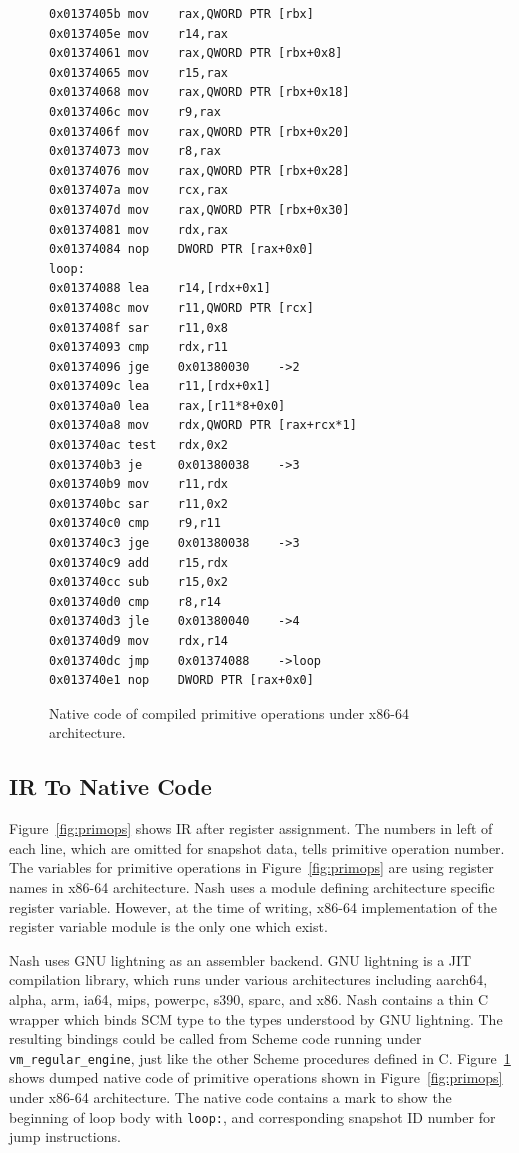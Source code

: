 \documentclass[preprint]{sigplanconf}
\begin{document}
\begin{figure}
  \centering
\begin{verbatim}
0x0137405b mov    rax,QWORD PTR [rbx]
0x0137405e mov    r14,rax
0x01374061 mov    rax,QWORD PTR [rbx+0x8]
0x01374065 mov    r15,rax
0x01374068 mov    rax,QWORD PTR [rbx+0x18]
0x0137406c mov    r9,rax
0x0137406f mov    rax,QWORD PTR [rbx+0x20]
0x01374073 mov    r8,rax
0x01374076 mov    rax,QWORD PTR [rbx+0x28]
0x0137407a mov    rcx,rax
0x0137407d mov    rax,QWORD PTR [rbx+0x30]
0x01374081 mov    rdx,rax
0x01374084 nop    DWORD PTR [rax+0x0]
loop:
0x01374088 lea    r14,[rdx+0x1]
0x0137408c mov    r11,QWORD PTR [rcx]
0x0137408f sar    r11,0x8
0x01374093 cmp    rdx,r11
0x01374096 jge    0x01380030    ->2
0x0137409c lea    r11,[rdx+0x1]
0x013740a0 lea    rax,[r11*8+0x0]
0x013740a8 mov    rdx,QWORD PTR [rax+rcx*1]
0x013740ac test   rdx,0x2
0x013740b3 je     0x01380038    ->3
0x013740b9 mov    r11,rdx
0x013740bc sar    r11,0x2
0x013740c0 cmp    r9,r11
0x013740c3 jge    0x01380038    ->3
0x013740c9 add    r15,rdx
0x013740cc sub    r15,0x2
0x013740d0 cmp    r8,r14
0x013740d3 jle    0x01380040    ->4
0x013740d9 mov    rdx,r14
0x013740dc jmp    0x01374088    ->loop
0x013740e1 nop    DWORD PTR [rax+0x0]
\end{verbatim}
\caption{Native code of compiled primitive operations under x86-64
  architecture.}
\label{fig:ncode}
\end{figure}

\subsection{IR To Native Code}
Figure~\hyperref[fig:primops]{\ref{fig:primops}} shows IR after register
assignment. The numbers in left of each line, which are omitted for snapshot
data, tells primitive operation number. The variables for primitive operations
in Figure~\hyperref[fig:primops]{\ref{fig:primops}} are using register names
in x86-64 architecture. Nash uses a module defining architecture specific
register variable. However, at the time of writing, x86-64 implementation of
the register variable module is the only one which exist.

Nash uses GNU lightning as an assembler backend.  GNU lightning is a JIT
compilation library, which runs under various architectures including aarch64,
alpha, arm, ia64, mips, powerpc, s390, sparc, and x86. Nash contains a thin C
wrapper which binds SCM type to the types understood by GNU lightning. The
resulting bindings could be called from Scheme code running under
\texttt{vm\_regular\_engine}, just like the other Scheme procedures defined in
C. Figure~\hyperref[fig:ncode]{\ref{fig:ncode}} shows dumped native code of
primitive operations shown in Figure~\hyperref[fig:primops]{\ref{fig:primops}}
under x86-64 architecture. The native code contains a mark to show the beginning
of loop body with \texttt{loop:}, and corresponding snapshot ID number for jump
instructions.
\end{document}
